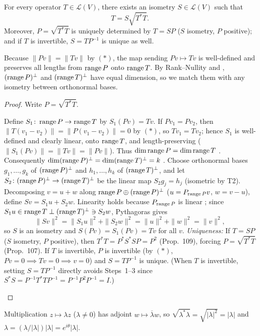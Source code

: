 \documentclass[10pt]{scrartcl}
\newcommand{\LL}{\mathcal L}\newcommand{\PP}{\mathcal P}\newcommand{\MM}{\mathcal M}
\begin{document}
\begin{theorem*}
  For every operator $T\in\LL(V)$, there exists an isometry $S\in\LL(V)$ such that
  \[
    T = S\sqrt{T^*T}.
  \]
  Moreover, $P=\sqrt{T^*T}$ is uniquely determined by $T=SP$ ($S$ isometry, $P$ positive); and if $T$ is invertible, $S=TP^{-1}$ is unique as well.
\end{theorem*}
\begin{ideabox}
  Because $\|Pv\|=\|Tv\|$ by $(\ast)$, the map sending $Pv\mapsto Tv$ is well-defined and preserves all lengths from $\operatorname{range} P$ onto $\operatorname{range} T$. By Rank--Nullity and , $(\operatorname{range} P)^\perp$ and $(\operatorname{range} T)^\perp$ have equal dimension, so we match them with any isometry between orthonormal bases.
\end{ideabox}
\begin{proof}
  Write $P=\sqrt{T^*T}$.
  \begin{steps}
    \ii Define $S_1\colon\operatorname{range} P\to\operatorname{range} T$ by $S_1(Pv)=Tv$. If $Pv_1=Pv_2$, then $\|T(v_1-v_2)\|=\|P(v_1-v_2)\|=0$ by $(\ast)$, so $Tv_1=Tv_2$; hence $S_1$ is well-defined and clearly linear, onto $\operatorname{range} T$, and length-preserving ($\|S_1(Pv)\|=\|Tv\|=\|Pv\|$). Thus $\dim\operatorname{range} P=\dim\operatorname{range} T$ .
    \ii Consequently $\dim(\operatorname{range} P)^\perp = \dim(\operatorname{range} T)^\perp = k$ . Choose orthonormal bases $g_1,\dots,g_k$ of $(\operatorname{range} P)^\perp$ and $h_1,\dots,h_k$ of $(\operatorname{range} T)^\perp$, and let $S_2\colon(\operatorname{range} P)^\perp\to(\operatorname{range} T)^\perp$ be the linear map $S_2g_j=h_j$ (isometric by T2).
    \ii Decomposing $v=u+w$ along $\operatorname{range} P\oplus(\operatorname{range} P)^\perp$ ($u=P_{\operatorname{range} P}v$, $w=v-u$), define $Sv=S_1u+S_2w$. Linearity holds because $P_{\operatorname{range} P}$ is linear ; since $S_1u\in\operatorname{range} T\perp(\operatorname{range} T)^\perp\ni S_2w$, Pythagoras  gives
    \[ \|Sv\|^2=\|S_1u\|^2+\|S_2w\|^2=\|u\|^2+\|w\|^2=\|v\|^2, \]
    so $S$ is an isometry and $S(Pv)=S_1(Pv)=Tv$ for all $v$.
    \ii \emph{Uniqueness:} If $T=SP$ ($S$ isometry, $P$ positive), then $T^*T=P^*S^*SP=P^2$ (Prop.~109), forcing $P=\sqrt{T^*T}$ (Prop.~107). If $T$ is invertible, $P$ is invertible (by $(\ast)$, $Pv=0\implies Tv=0\implies v=0$) and $S=TP^{-1}$ is unique. (When $T$ is invertible, setting $S=TP^{-1}$ directly avoids Steps~1--3 since $S^*S=P^{-1}T^*TP^{-1}=P^{-1}P^2P^{-1}=I$.)
  \end{steps}
\end{proof}

\begin{example*}
  Multiplication $z\mapsto\lambda z$ ($\lambda\neq0$) has adjoint $w\mapsto\overline{\lambda}w$, so $\sqrt{\lambda^*\lambda}=\sqrt{|\lambda|^2}=|\lambda|$ and $\lambda = (\lambda/|\lambda|)|\lambda| = e^{i\theta}|\lambda|$.
\end{example*}
\end{document}
